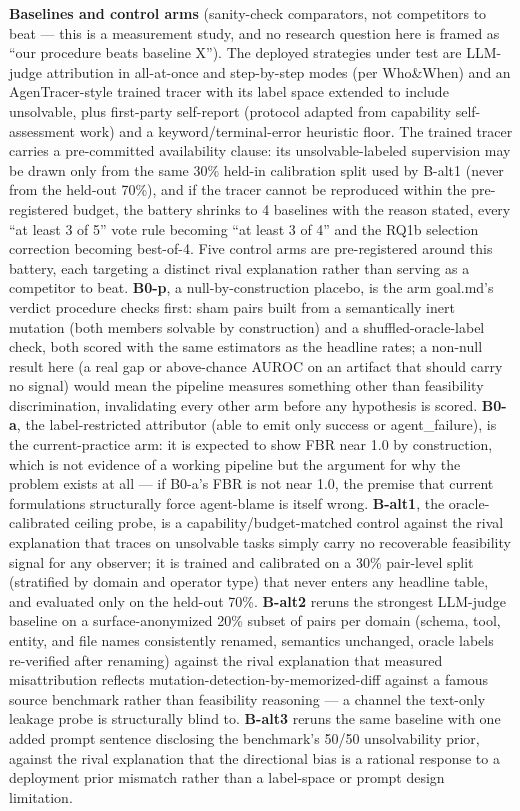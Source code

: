 \documentclass[11pt]{article}
\begin{document}
\textbf{Baselines and control arms} (sanity-check comparators, not competitors to beat --- this is a measurement study, and no research question here is framed as ``our procedure beats baseline X''). The deployed strategies under test are LLM-judge attribution in all-at-once and step-by-step modes (per Who\&When) and an AgenTracer-style trained tracer with its label space extended to include unsolvable, plus first-party self-report (protocol adapted from capability self-assessment work) and a keyword/terminal-error heuristic floor. The trained tracer carries a pre-committed availability clause: its unsolvable-labeled supervision may be drawn only from the same 30\% held-in calibration split used by B-alt1 (never from the held-out 70\%), and if the tracer cannot be reproduced within the pre-registered budget, the battery shrinks to 4 baselines with the reason stated, every ``at least 3 of 5'' vote rule becoming ``at least 3 of 4'' and the RQ1b selection correction becoming best-of-4. Five control arms are pre-registered around this battery, each targeting a distinct rival explanation rather than serving as a competitor to beat. \textbf{B0-p}, a null-by-construction placebo, is the arm goal.md's verdict procedure checks first: sham pairs built from a semantically inert mutation (both members solvable by construction) and a shuffled-oracle-label check, both scored with the same estimators as the headline rates; a non-null result here (a real gap or above-chance AUROC on an artifact that should carry no signal) would mean the pipeline measures something other than feasibility discrimination, invalidating every other arm before any hypothesis is scored. \textbf{B0-a}, the label-restricted attributor (able to emit only success or agent\_failure), is the current-practice arm: it is expected to show FBR near 1.0 by construction, which is not evidence of a working pipeline but the argument for why the problem exists at all --- if B0-a's FBR is not near 1.0, the premise that current formulations structurally force agent-blame is itself wrong. \textbf{B-alt1}, the oracle-calibrated ceiling probe, is a capability/budget-matched control against the rival explanation that traces on unsolvable tasks simply carry no recoverable feasibility signal for any observer; it is trained and calibrated on a 30\% pair-level split (stratified by domain and operator type) that never enters any headline table, and evaluated only on the held-out 70\%. \textbf{B-alt2} reruns the strongest LLM-judge baseline on a surface-anonymized 20\% subset of pairs per domain (schema, tool, entity, and file names consistently renamed, semantics unchanged, oracle labels re-verified after renaming) against the rival explanation that measured misattribution reflects mutation-detection-by-memorized-diff against a famous source benchmark rather than feasibility reasoning --- a channel the text-only leakage probe is structurally blind to. \textbf{B-alt3} reruns the same baseline with one added prompt sentence disclosing the benchmark's 50/50 unsolvability prior, against the rival explanation that the directional bias is a rational response to a deployment prior mismatch rather than a label-space or prompt design limitation.
\end{document}
